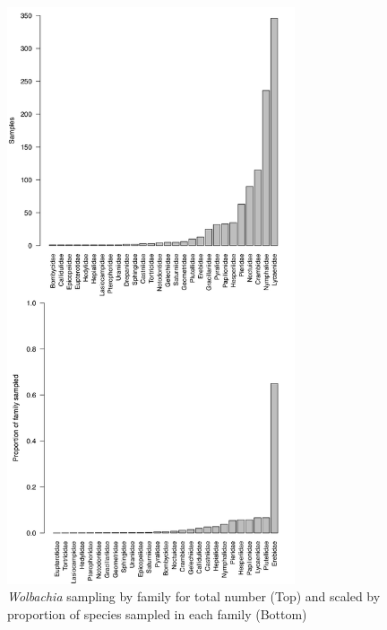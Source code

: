 \documentclass{frontiersSCNS} %
\begin{document}
\begin{figure}[h!]
\begin{center}
\includegraphics[width=85mm]{Fams_n_Props.pdf}%
\end{center}
\caption{\textit{Wolbachia} sampling by family for total number (Top) and scaled by proportion of species sampled in each family (Bottom)  }
\label{histograms}
\end{figure}
\end{document}
